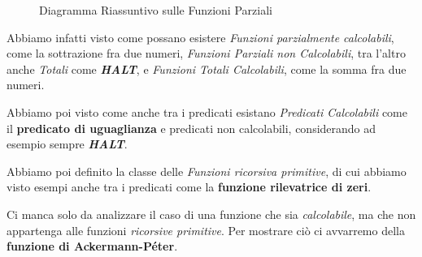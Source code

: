 \begin{figure}[ht]
  \caption{Diagramma Riassuntivo sulle Funzioni Parziali}
\end{figure}

Abbiamo infatti visto come possano esistere \textit{Funzioni parzialmente calcolabili}, come la sottrazione fra due numeri, \textit{Funzioni Parziali non Calcolabili}, tra l'altro anche \textit{Totali} come \textbf{\textit{HALT}}, e \textit{Funzioni Totali Calcolabili}, come la somma fra due numeri.

Abbiamo poi visto come anche tra i predicati esistano \textit{Predicati Calcolabili} come il \textbf{predicato di uguaglianza} e predicati non calcolabili, considerando ad esempio sempre \textbf{\textit{HALT}}.

Abbiamo poi definito la classe delle \textit{Funzioni ricorsiva primitive}, di cui abbiamo visto esempi anche tra i predicati come la \textbf{funzione rilevatrice di zeri}.

Ci manca solo da analizzare il caso di una funzione che sia \textit{calcolabile}, ma che non appartenga alle funzioni \textit{ricorsive primitive}. Per mostrare ciò ci avvarremo della \textbf{funzione di Ackermann-Péter}.

